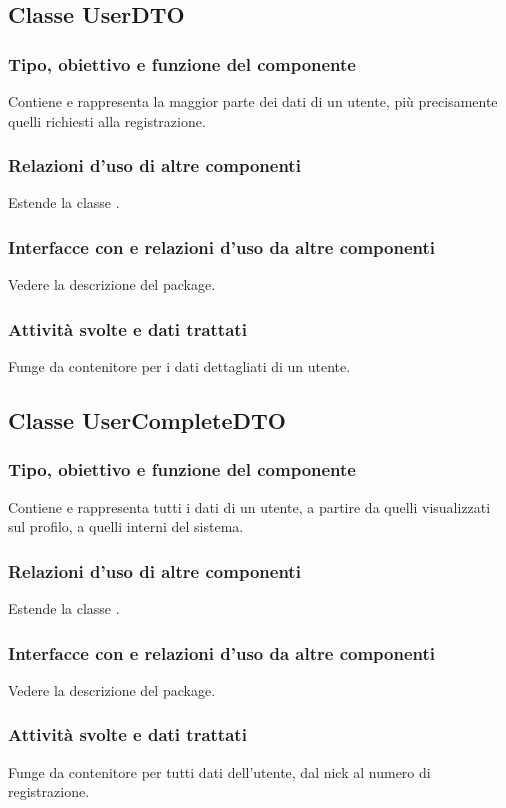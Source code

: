 \subsection{Classe UserDTO}
\subsubsection*{Tipo, obiettivo e funzione del componente}
Contiene e rappresenta la maggior parte dei dati di un utente, pi\`u
precisamente quelli richiesti alla registrazione.
\subsubsection*{Relazioni d'uso di altre componenti}
Estende la classe .
\subsubsection*{Interfacce con e relazioni d'uso da altre componenti}
Vedere la descrizione del package.
\subsubsection*{Attivit\`a svolte e dati trattati}
Funge da contenitore per i dati dettagliati di un utente.

\subsection{Classe UserCompleteDTO}
\subsubsection*{Tipo, obiettivo e funzione del componente}
Contiene e rappresenta tutti i dati di un utente, a partire da quelli
visualizzati sul profilo, a quelli interni del sistema.
\subsubsection*{Relazioni d'uso di altre componenti}
Estende la classe .
\subsubsection*{Interfacce con e relazioni d'uso da altre componenti}
Vedere la descrizione del package.
\subsubsection*{Attivit\`a svolte e dati trattati}
Funge da contenitore per tutti dati dell'utente, dal nick al numero di
registrazione.

